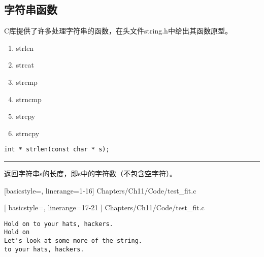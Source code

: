 \subsection{字符串函数}

\begin{frame}[fragile]\ft{\subsecname} 
C库提供了许多处理字符串的函数，在头文件string.h中给出其函数原型。
\begin{enumerate}
\item strlen 
\item strcat 
\item strcmp 
\item strncmp 
\item strcpy 
\item strncpy
\end{enumerate}
\end{frame}


\begin{frame}[fragile] 
\begin{lstlisting}[title=strlen函数原型, basicstyle=\ttfamily]
int * strlen(const char * s);
\end{lstlisting}
\rule{\textwidth}{0.3mm} \vspace{0.3mm}

返回字符串s的长度，即s中的字符数（不包含空字符）。
\end{frame}

\begin{frame}[fragile]

[basicstyle=\ttfamily,
 linerange={1-16}]
{Chapters/Ch11/Code/test_fit.c}
\end{frame}

\begin{frame}[fragile]

[
 basicstyle=\ttfamily,
 linerange={17-21}
]
{Chapters/Ch11/Code/test_fit.c}
\end{frame}

\begin{frame}[fragile]
\begin{lstlisting}[basicstyle=\ttfamily]
Hold on to your hats, hackers.
Hold on
Let's look at some more of the string.
to your hats, hackers.
\end{lstlisting}
\end{frame}

